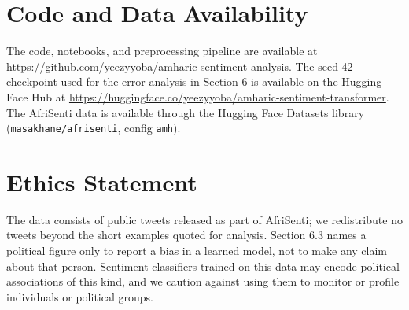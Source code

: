 \section*{Code and Data Availability}

The code, notebooks, and preprocessing pipeline are available at \url{https://github.com/yeezyyoba/amharic-sentiment-analysis}. The seed-42 checkpoint used for the error analysis in Section 6 is available on the Hugging Face Hub at \url{https://huggingface.co/yeezyyoba/amharic-sentiment-transformer}. The AfriSenti data is available through the Hugging Face Datasets library (\texttt{masakhane/afrisenti}, config \texttt{amh}).

\section*{Ethics Statement}

The data consists of public tweets released as part of AfriSenti; we redistribute no tweets beyond the short examples quoted for analysis. Section 6.3 names a political figure only to report a bias in a learned model, not to make any claim about that person. Sentiment classifiers trained on this data may encode political associations of this kind, and we caution against using them to monitor or profile individuals or political groups.

